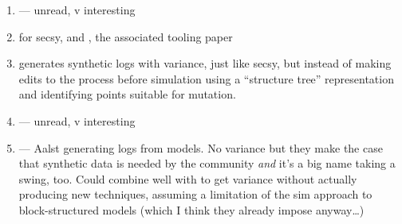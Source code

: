 

\begin{enumerate}
    \item \cite{Yousfi_2015} --- unread, v interesting
    \item \cite{stocker2013secsy} for secsy, and \cite{stocker2014secsy}, the associated
    tooling paper
    \item \cite{pourmasoumi2015business} generates synthetic logs with variance,
    just like secsy, but instead of making edits to the process before
    simulation using a ``structure tree'' representation and identifying points
    suitable for mutation.
    \item \cite{Loreti_2019} --- unread, v interesting
    \item \cite{ExecutableBPMNMitsyuk} --- Aalst generating logs from models. No
    variance but they make the case that synthetic data is needed by the
    community \emph{and} it's a big name taking a swing, too. Could combine well
    with \cite{pourmasoumi2015business} to get variance without actually
    producing new techniques, assuming a limitation of the sim approach to
    block-structured models (which I think they already impose anyway…)
\end{enumerate}
